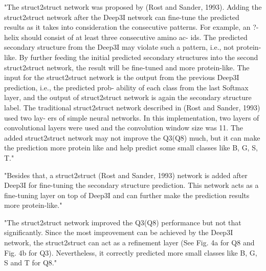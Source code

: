 \documentclass[]{scrartcl}
\begin{document}
"The struct2struct network was proposed by (Rost and Sander, 1993). Adding the struct2struct network after the Deep3I network can fine-tune the predicted results as it takes into consideration the consecutive patterns. For example, an ?-helix should consist of at least three consecutive amino ac- ids. The predicted secondary structure from the Deep3I may violate such a pattern, i.e., not protein-like. By further feeding the initial predicted secondary structures into the second struct2struct network, the result will be fine-tuned and more protein-like. The input for the struct2struct network is the output from the previous Deep3I prediction, i.e., the predicted prob- ability of each class from the last Softmax layer, and the output of struct2struct network is again the secondary structure label. The traditional struct2struct network described in (Rost and Sander, 1993) used two lay- ers of simple neural networks. In this implementation, two layers of convolutional layers were used and the convolution window size was 11. The added struct2struct network may not improve the Q3(Q8) much, but it can make the prediction more protein like and help predict some small classes like B, G, S, T." \cite{Fang2017}

"Besides that, a struct2struct (Rost and Sander, 1993) network is added after Deep3I for fine-tuning the secondary structure prediction. This network acts as a fine-tuning layer on top of Deep3I and can further make the prediction results more protein-like." \cite{Fang2017}

"The struct2struct network improved the Q3(Q8) performance but not that significantly. Since the most improvement can be achieved by the Deep3I network, the struct2struct can act as a refinement layer (See Fig. 4a for Q8 and Fig. 4b for Q3). Nevertheless, it correctly predicted more small classes like B, G, S and T for Q8." \cite{Fang2017}
\end{document}
